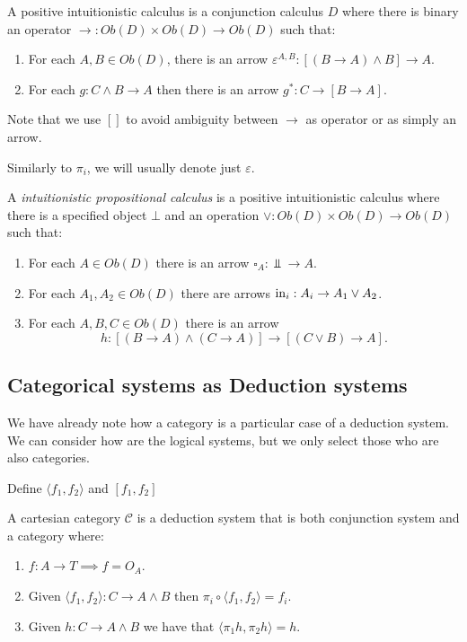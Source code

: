 \begin{definition} \label{def:positivecalculus}
  A positive intuitionistic calculus is a conjunction calculus $D$ where there is binary an operator $\to: Ob(D)\times Ob(D) \to Ob(D)$ such that:
  \begin{enumerate}
  \item For each $A,B \in Ob(D)$, there is an arrow $\varepsilon^{A,B}: [(B \to A) \land B]\to A$.
  \item For each $g:C\land B \to A$ then there is an arrow $g^*: C\to [B\to A]$.
  \end{enumerate}
\end{definition}
\begin{remark}
  Note that we use $[]$ to avoid ambiguity between $\to$ as operator or as simply an arrow.
\end{remark}
Similarly to $\pi_i$, we will usually denote just $\varepsilon$. 
\begin{definition}
  A \emph{intuitionistic propositional calculus} is a positive intuitionistic calculus where there is a specified object $\bot$ and an operation $\lor: Ob(D)\times Ob(D) \to Ob(D)$ such that:
  \begin{enumerate}
  \item For each $A\in Ob(D)$ there is an arrow $\square_A: \Bot\to A$.
  \item For each $A_1,A_2\in Ob(D)$ there are arrows $\operatorname{in}_i: A_i\to A_1 \lor A_2 $.
  \item For each $A,B,C \in Ob(D)$ there is an arrow $$h:[(B\to A)\land (C\to A)] \to [(C\lor B)\to A].$$
  \end{enumerate}
\end{definition}

\subsection{Categorical systems as Deduction systems}

We have already note how a category is a particular case of a deduction system. We can consider how are the logical systems, but we only select those who are also categories.\\

\begin{remark} {\color{red} Define $\langle f_1,f_2\rangle$ and $[f_1,f_2]$}
  
\end{remark}


\begin{proposition}
  A cartesian category $\mathcal{C}$ is a deduction system that is both conjunction system and a category where:
  \begin{enumerate}
  \item $f:A\to T\implies f=O_A$.
  \item Given $\langle f_1,f_2\rangle: C\to A\land B$ then $\pi_i \circ \langle f_1,f_2\rangle = f_i$.
  \item Given $h:C\to A\land B$ we have that $\langle \pi_1 h, \pi_2 h\rangle = h$.
  \end{enumerate}
\end{proposition}

